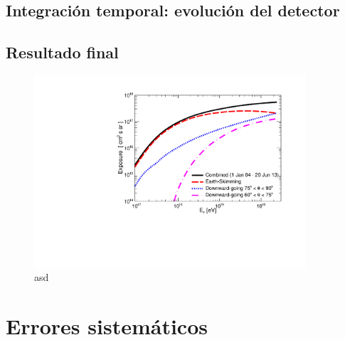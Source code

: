 	\subsection{Integración temporal: evolución del detector}
	
	
	
	\subsection{Resultado final}
	
	\begin{figure}[h!]
		\begin{center}
			\includegraphics[width=0.9\textwidth]{fig/resultadosAuger/exposure_combined_ageing}
			\caption{asd}
			\label{fig:}
		\end{center}
	\end{figure}
	
\section{Errores sistem\'aticos}
			

